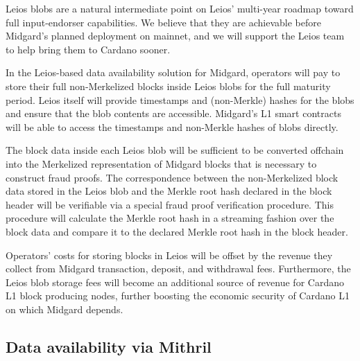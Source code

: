 \documentclass[../midgard.tex]{subfiles}
\begin{document}
Leios blobs are a natural intermediate point on Leios' multi-year roadmap toward full input-endorser capabilities.
We believe that they are achievable before Midgard's planned deployment on mainnet, and we will support the Leios team to help bring them to Cardano sooner.

In the Leios-based data availability solution for Midgard, operators will pay to store their full non-Merkelized blocks inside Leios blobs for the full maturity period.
Leios itself will provide timestamps and (non-Merkle) hashes for the blobs and ensure that the blob contents are accessible.
Midgard's L1 smart contracts will be able to access the timestamps and non-Merkle hashes of blobs directly.

The block data inside each Leios blob will be sufficient to be converted offchain into the Merkelized representation of Midgard blocks that is necessary to construct fraud proofs.
The correspondence between the non-Merkelized block data stored in the Leios blob and the Merkle root hash declared in the block header will be verifiable via a special fraud proof verification procedure.
This procedure will calculate the Merkle root hash in a streaming fashion over the block data and compare it to the declared Merkle root hash in the block header.


Operators' costs for storing blocks in Leios will be offset by the revenue they collect from Midgard transaction, deposit, and withdrawal fees.
Furthermore, the Leios blob storage fees will become an additional source of revenue for Cardano L1 block producing nodes, further boosting the economic security of Cardano L1 on which Midgard depends.

\subsection{Data availability via Mithril}
\label{h:data-availability-multisig}
\end{document}
